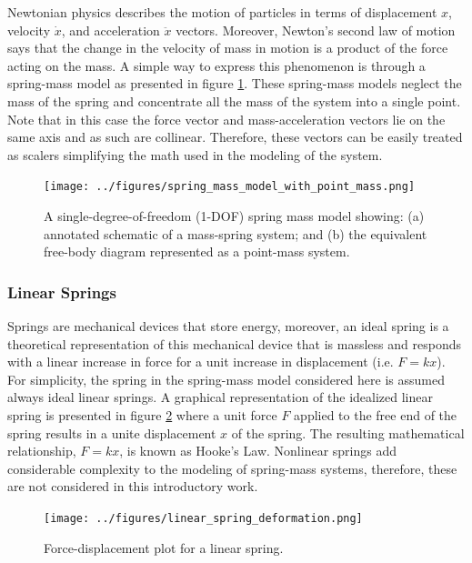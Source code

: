 \documentclass[12pt,letter]{article}
\numberwithin{ex}{section} %
\numberwithin{re}{section} %
\numberwithin{vcs}{section} %
\begin{document}
            Newtonian physics describes the motion of particles in terms of displacement $x$, velocity $\dot{x}$, and acceleration $\ddot{x}$ vectors. Moreover, Newton's second law of motion says that the change in the velocity of mass in motion is a product of the force acting on the mass. A simple way to express this phenomenon is through a spring-mass model as presented in figure  \ref{fig:spring_mass_model_with_point_mass}. These spring-mass models neglect the mass of the spring and concentrate all the mass of the system into a single point. Note that in this case the force vector and mass-acceleration vectors lie on the same axis and as such are collinear. Therefore, these vectors can be easily treated as scalers simplifying the math used in the modeling of the system.     

			\begin{figure}[H]
				\centering
				\texttt{[image: ../figures/spring\_mass\_model\_with\_point\_mass.png]}
				\caption{A single-degree-of-freedom (1-DOF) spring mass model showing: (a) annotated schematic of a mass-spring system; and (b) the equivalent free-body diagram represented as a point-mass system.}
				\label{fig:spring_mass_model_with_point_mass}
			\end{figure}	
		
		\subsubsection{Linear Springs}
	
            Springs are mechanical devices that store energy, moreover, an ideal spring is a theoretical representation of this mechanical device that is massless and responds with a linear increase in force for a unit increase in displacement (i.e. $F=kx$). For simplicity, the spring in the spring-mass model considered here is assumed always ideal linear springs. A graphical representation of the idealized linear spring is presented in figure \ref{fig:linear_spring_deformation} where a unit force $F$ applied to the free end of the spring results in a unite displacement $x$ of the spring.  The resulting mathematical relationship,  $F=kx$, is known as Hooke's Law. Nonlinear springs add considerable complexity to the modeling of spring-mass systems, therefore, these are not considered in this introductory work. 
			
			\begin{figure}[H]
				\centering
				\texttt{[image: ../figures/linear\_spring\_deformation.png]}
				\caption{Force-displacement plot for a linear spring.}
				\label{fig:linear_spring_deformation}
			\end{figure}					
\end{document}
